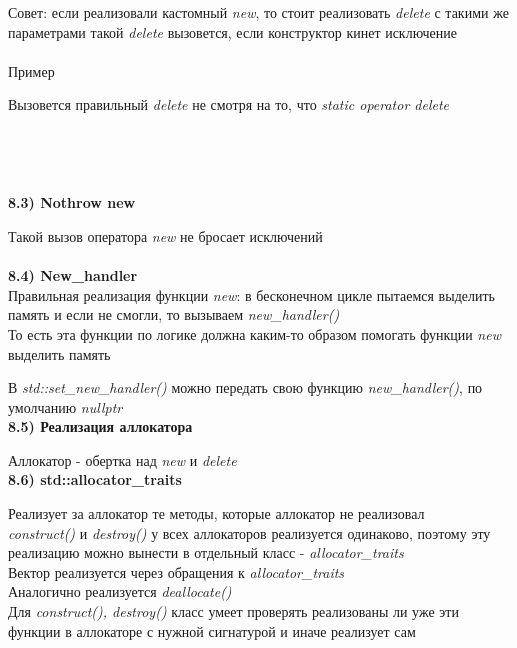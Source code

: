 \documentclass{article}
\begin{document}
Совет: если реализовали кастомный \textit{new}, то стоит реализовать \textit{delete} с такими же параметрами такой \textit{delete} вызовется, если конструктор кинет исключение\\\\
Пример

Вызовется правильный \textit{delete} не смотря на то, что \textit{static operator delete}\\\\\\\\\\
\noindent \textbf{8.3) Nothrow new}

Такой вызов оператора \textit{new} не бросает исключений\\\\
\noindent \textbf{8.4) New\_handler}\\
Правильная реализация функции \textit{new}: в бесконечном цикле пытаемся выделить память и если не смогли, то вызываем \textit{new\_handler()}\\
То есть эта функции по логике должна каким-то образом помогать функции \textit{new} выделить память

В \textit{std::set\_new\_handler()} можно передать свою функцию \textit{new\_handler()}, по умолчанию \textit{nullptr}\\

\noindent \textbf{8.5) Реализация аллокатора}

Аллокатор - обертка над \textit{new} и \textit{delete}\\
\noindent \textbf{8.6) std::allocator\_traits}

Реализует за аллокатор те методы, которые аллокатор не реализовал\\
\textit{construct()} и \textit{destroy()} у всех аллокаторов реализуется одинаково, поэтому эту реализацию можно вынести в отдельный класс - \textit{allocator\_traits}\\
Вектор реализуется через обращения к \textit{allocator\_traits}\\

Аналогично реализуется \textit{deallocate()}\\
Для \textit{construct(), destroy()} класс умеет проверять реализованы ли уже эти функции в аллокаторе с нужной сигнатурой и иначе реализует сам
\end{document}

